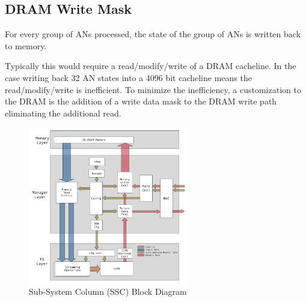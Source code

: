 \documentclass[journal]{IEEEtran}
\begin{document}
\subsection{DRAM Write Mask}
\label{sec:dramWriteMask}

For every group of ANs processed, the state of the group of ANs is written back to memory.

Typically this would require a read/modify/write of a DRAM cacheline. In the case writing back 32 AN states into a 4096 bit cacheline means the read/modify/write is inefficient.
To minimize the inefficiency, a customization to the DRAM is the addition of a write data mask to the DRAM write path eliminating the additional read.


%
%
\iftrue

\begin{figure}[!t]
\centering
\captionsetup{justification=centering}
\captionsetup{width=.9\linewidth}
\centerline{
\mbox{\includegraphics[width=2.75in]{DetailedFlowDiagram.jpg}}
}
\center\caption{Sub-System Column (SSC) Block Diagram}
\label{fig:DetailedFlowDiagram}
\end{figure}
\end{document}
